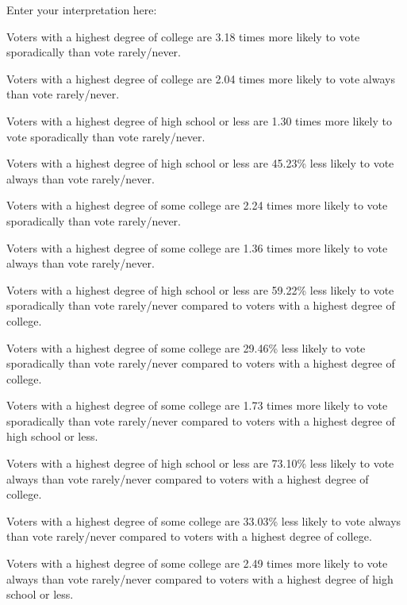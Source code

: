 \documentclass[
  letterpaper,
  DIV=11,
  numbers=noendperiod]{scrartcl}
\begin{document}
Enter your interpretation here:

Voters with a highest degree of college are 3.18 times more likely to
vote sporadically than vote rarely/never.

Voters with a highest degree of college are 2.04 times more likely to
vote always than vote rarely/never.

Voters with a highest degree of high school or less are 1.30 times more
likely to vote sporadically than vote rarely/never.

Voters with a highest degree of high school or less are 45.23\% less
likely to vote always than vote rarely/never.

Voters with a highest degree of some college are 2.24 times more likely
to vote sporadically than vote rarely/never.

Voters with a highest degree of some college are 1.36 times more likely
to vote always than vote rarely/never.

Voters with a highest degree of high school or less are 59.22\% less
likely to vote sporadically than vote rarely/never compared to voters
with a highest degree of college.

Voters with a highest degree of some college are 29.46\% less likely to
vote sporadically than vote rarely/never compared to voters with a
highest degree of college.

Voters with a highest degree of some college are 1.73 times more likely
to vote sporadically than vote rarely/never compared to voters with a
highest degree of high school or less.

Voters with a highest degree of high school or less are 73.10\% less
likely to vote always than vote rarely/never compared to voters with a
highest degree of college.

Voters with a highest degree of some college are 33.03\% less likely to
vote always than vote rarely/never compared to voters with a highest
degree of college.

Voters with a highest degree of some college are 2.49 times more likely
to vote always than vote rarely/never compared to voters with a highest
degree of high school or less.
\end{document}
